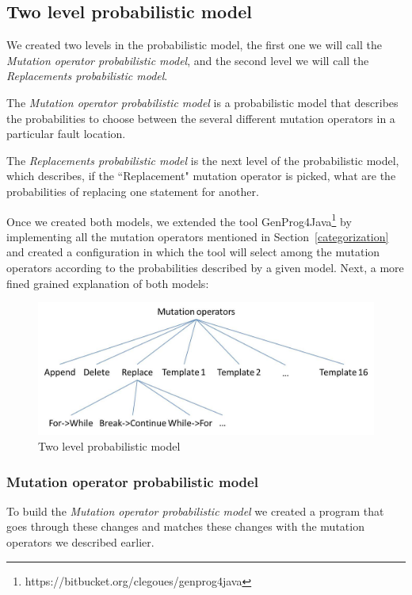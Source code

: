 \documentclass[conference]{IEEEtran}
\begin{document}
\subsection{Two level probabilistic model}

We created two levels in the probabilistic model, the first one we will call the 
\textit{Mutation operator probabilistic model}, and the second level we will 
call the \textit{Replacements probabilistic model}.

The \textit{Mutation operator probabilistic model} is a probabilistic model that 
describes the probabilities to choose between the several different mutation 
operators in a particular fault location.

The \textit{Replacements probabilistic model} is the next level of the 
probabilistic model, which describes, if the ``Replacement" mutation operator is 
picked, what are the probabilities of replacing one statement for another. 

Once we created both models, we extended the tool GenProg4Java\footnote{https://bitbucket.org/clegoues/genprog4java}
 by implementing all the mutation operators mentioned in Section~\ref{categorization} and created a configuration in which the tool will select among the mutation operators according to the probabilities described by a given model. Next, a more fined grained explanation of both models:

\begin{figure}[!h]
  \centering
    \includegraphics[scale=0.4]{Picture2}
  \caption{Two level probabilistic model}
  \label{fig:probModel}
\end{figure}

\subsubsection{Mutation operator probabilistic model}
To build the \textit{Mutation operator probabilistic model} we created 
a program that goes through these 
changes and matches these changes with the mutation operators we described 
earlier.
\end{document}
